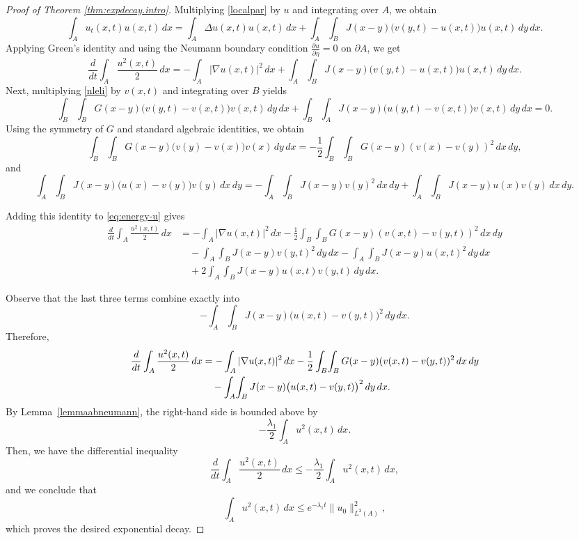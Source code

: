 \documentclass[reqno]{amsart}
\numberwithin{equation}{section}
\begin{document}
\begin{proof}[Proof of Theorem \ref{thm:expdecay.intro}]
Multiplying \eqref{localpar} by $u$ and integrating over $A$, we obtain
\[
\int_A u_t(x,t)u(x,t)\,dx
= \int_A \Delta u(x,t)u(x,t)\,dx
  + \int_A\!\int_B J(x-y)\bigl(v(y,t)-u(x,t)\bigr)u(x,t)\,dy\,dx.
\]
Applying Green's identity and using the Neumann boundary condition
$\frac{\partial u}{\partial\eta}=0$ on $\partial A$, we get
\[
\frac{d}{dt}\int_A \frac{u^2 (x,t)}{2}\,dx
= -\int_A |\nabla u(x,t)|^2\,dx
  + \int_A\!\int_B J(x-y)\bigl(v(y,t)-u(x,t)\bigr)u(x,t)\,dy\,dx.
\label{eq:energy-u}
\]
Next, multiplying \eqref{nleli} by $v(x,t)$ and integrating over $B$ yields
\[
\int_B\!\int_B
G(x-y)\bigl(v(y,t)-v(x,t)\bigr)v(x,t)\,dy\,dx
  + \int_B\!\int_A J(x-y)\bigl(u(y,t)-v(x,t)\bigr)v(x,t)\,dy\,dx
  = 0.
\]
Using the symmetry of $G$ and standard algebraic identities, we obtain
\[
\int_B\!\int_B G(x-y)\bigl(v(y)-v(x)\bigr)v(x)\,dy\,dx
= -\frac12 \int_B\!\int_B G(x-y)(v(x)-v(y))^2\,dx\,dy,
\]
and
\[
\int_A\!\int_B J(x-y)\bigl(u(x)-v(y)\bigr)v(y)\,dx\,dy
=
-\int_A\!\int_B J(x-y)v(y)^2\,dx\,dy
+ \int_A\!\int_B J(x-y)u(x)v(y)\,dx\,dy.
\]

Adding this identity to \eqref{eq:energy-u} gives
\begin{align*}
\frac{d}{dt}\int_A \frac{u^2 (x,t)}{2}\,dx
&= -\int_A |\nabla u(x,t)|^2\,dx
   - \frac12 \int_B\!\int_B G(x-y)(v(x,t)-v(y,t))^2\,dx\,dy \\
&\quad
   -\int_A\!\int_B J(x-y)v(y,t)^2\,dy\,dx
   -\int_A\!\int_B J(x-y)u(x,t)^2\,dy\,dx \\
&\quad
   + 2\int_A\!\int_B J(x-y)u(x,t)v(y,t)\,dy\,dx.
\end{align*}

Observe that the last three terms combine exactly into
\[
-\int_A\!\int_B J(x-y)\bigl(u(x,t)-v(y,t)\bigr)^2\,dy\,dx.
\]
Therefore,
\begin{align}
\frac{d}{dt}\int_A \frac{u^2(x,t)}{2}\,dx
&= -\int_A |\nabla u(x,t)|^2\,dx
   -\frac12 \int_B\!\int_B G(x-y)(v(x,t)-v(y,t))^2\,dx\,dy \notag\\
&\quad
   -\int_A\!\int_B J(x-y)\bigl(u(x,t)-v(y,t)\bigr)^2\,dy\,dx.
\label{energy-final}
\end{align}
By  Lemma~\ref{lemmaabneumann}, the right-hand side is bounded above by
\[
- \frac{\lambda_1}2 \int_A u^2(x,t)\,dx.
\]
Then, we have the differential
inequality
\[
\frac{d}{dt}\int_A \frac{u^2(x,t)}{2}\,dx
\le - \frac{\lambda_1}2 \int_A u^2(x,t)\,dx,
\]
and we conclude that
\[
\int_A u^2(x,t)\,dx
\le e^{- \lambda_1 t}\|u_0\|_{L^2(A)}^2,
\]
which proves the desired exponential decay.
\end{proof}
\end{document}
